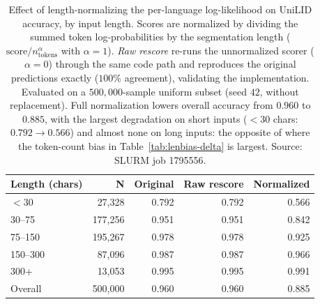 \begin{table}[htbp]
\centering
\small
\begin{tabular}{lrrrr}
\toprule
\textbf{Length (chars)} & \textbf{N} & \textbf{Original} & \textbf{Raw rescore} & \textbf{Normalized} \\
\midrule
$<$30    &  27,328 & 0.792 & 0.792 & 0.566 \\
30--75   & 177,256 & 0.951 & 0.951 & 0.842 \\
75--150  & 195,267 & 0.978 & 0.978 & 0.925 \\
150--300 &  87,096 & 0.987 & 0.987 & 0.966 \\
300+     &  13,053 & 0.995 & 0.995 & 0.991 \\
\midrule
Overall  & 500,000 & 0.960 & 0.960 & 0.885 \\
\bottomrule
\end{tabular}
\caption{%
  Effect of length-normalizing the per-language log-likelihood on UniLID accuracy, by input
  length. Scores are normalized by dividing the summed token log-probabilities by the
  segmentation length ($\mathrm{score}/n_{\mathrm{tokens}}^{\alpha}$ with $\alpha=1$).
  \emph{Raw rescore} re-runs the unnormalized scorer ($\alpha=0$) through the same code path
  and reproduces the original predictions exactly ($100\%$ agreement), validating the
  implementation. Evaluated on a $500{,}000$-sample uniform subset (seed $42$, without
  replacement). Full normalization lowers overall accuracy from $0.960$ to $0.885$, with the
  largest degradation on short inputs ($<$30 chars: $0.792 \to 0.566$) and almost none on long
  inputs: the opposite of where the token-count bias in Table~\ref{tab:lenbias-delta} is
  largest. Source: SLURM job 1795556.%
}
\label{tab:lenbias-norm}
\end{table}
